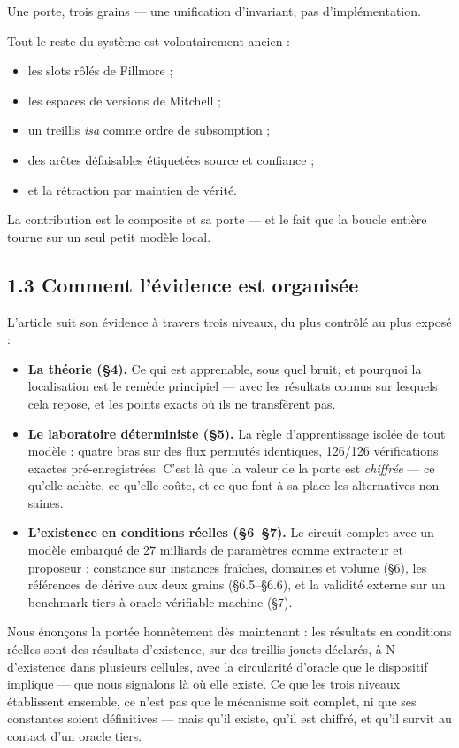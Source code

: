 \documentclass[11pt]{article}
\begin{document}
Une porte, trois grains — une unification d'invariant, pas d'implémentation.

Tout le reste du système est volontairement ancien :

\begin{itemize}
\item les slots rôlés de Fillmore ;
\item les espaces de versions de Mitchell ;
\item un treillis \emph{isa} comme ordre de subsomption ;
\item des arêtes défaisables étiquetées source et confiance ;
\item et la rétraction par maintien de vérité.
\end{itemize}

La contribution est le composite et sa porte — et le fait que la boucle entière tourne sur un seul petit modèle local.

\subsection*{1.3 Comment l'évidence est organisée}

L'article suit son évidence à travers trois niveaux, du plus contrôlé au plus exposé :

\begin{itemize}
\item \textbf{La théorie (§4).} Ce qui est apprenable, sous quel bruit, et pourquoi la localisation est le remède principiel — avec les résultats connus sur lesquels cela repose, et les points exacts où ils ne transfèrent pas.
\item \textbf{Le laboratoire déterministe (§5).} La règle d'apprentissage isolée de tout modèle : quatre bras sur des flux permutés identiques, 126/126 vérifications exactes pré-enregistrées. C'est là que la valeur de la porte est \emph{chiffrée} — ce qu'elle achète, ce qu'elle coûte, et ce que font à sa place les alternatives non-saines.
\item \textbf{L'existence en conditions réelles (§6–§7).} Le circuit complet avec un modèle embarqué de 27 milliards de paramètres comme extracteur et proposeur : constance sur instances fraîches, domaines et volume (§6), les références de dérive aux deux grains (§6.5–§6.6), et la validité externe sur un benchmark tiers à oracle vérifiable machine (§7).
\end{itemize}

Nous énonçons la portée honnêtement dès maintenant : les résultats en conditions réelles sont des résultats d'existence, sur des treillis jouets déclarés, à N d'existence dans plusieurs cellules, avec la circularité d'oracle que le dispositif implique — que nous signalons là où elle existe. Ce que les trois niveaux établissent ensemble, ce n'est pas que le mécanisme soit complet, ni que ses constantes soient définitives — mais qu'il existe, qu'il est chiffré, et qu'il survit au contact d'un oracle tiers.
\end{document}
